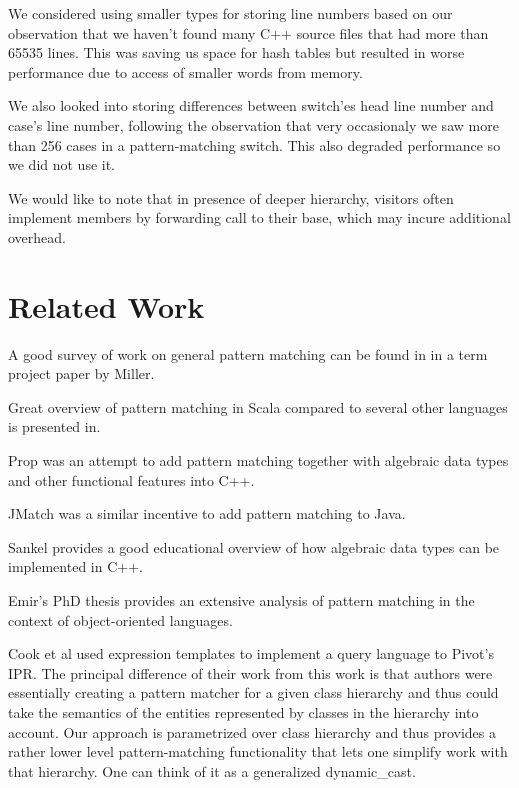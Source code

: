 \documentclass[preprint]{sigplanconf}
\begin{document}
We considered using smaller types for storing line numbers based on our 
observation that we haven't found many C++ source files that had more than 65535 
lines. This was saving us space for hash tables but resulted in worse 
performance due to access of smaller words from memory.

We also looked into storing differences between switch'es head line number and 
case's line number, following the observation that very occasionaly we saw more 
than 256 cases in a pattern-matching switch. This also degraded performance so 
we did not use it.

We would like to note that in presence of deeper hierarchy, visitors often 
implement members by forwarding call to their base, which may incure additional 
overhead.

\section{Related Work} %
\label{sec:rw}

A good survey of work on general pattern matching can be found in in a term 
project paper by Miller\cite{Miller10}.

Great overview of pattern matching in Scala compared to several other languages 
is presented in\cite{ScalaPM}.

Prop was an attempt to add pattern matching together with algebraic data types 
and other functional features into C++\cite{Prop96}.

JMatch was a similar incentive to add pattern matching to Java.

Sankel provides a good educational overview of how algebraic data types can be 
implemented in C++\cite{SankelFP10,Sankel10}. 

Emir's PhD thesis provides an extensive analysis of pattern matching in the 
context of object-oriented languages\cite{EmirThesis}.

Cook et al used expression templates to implement a query language to Pivot's 
IPR\cite{iql04}. The principal difference of their work from this work is that 
authors were essentially creating a pattern matcher for a given class hierarchy 
and thus could take the semantics of the entities represented by classes in the 
hierarchy into account. Our approach is parametrized over class hierarchy and 
thus provides a rather lower level pattern-matching functionality that lets one 
simplify work with that hierarchy.  One can think of it as a generalized 
dynamic\_cast.
\end{document}

